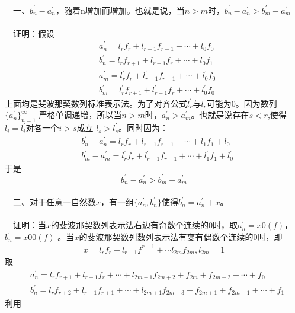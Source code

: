 \documentclass[UTF8,nofonts,cs4size]{ctexrep}
\begin{document}
\paragraph{}
\indent\ \
一、$b_{n}^{'}-a_{n}^{'}$，随着n增加而增加。也就是说，当$n>m$时，$b_{n}^{'}-a_{n}^{'}>b_{m}^{'}-a_{m}^{'}$
\paragraph{}
\indent\ \
证明：假设
\begin{eqnarray}
& a_{n}^{'} = l_r f_r+l_{r-1}f_{r-1}+\cdots +l_0f_0 \\
& b_{n}^{'} = l_r f_{r+1}+l_{r-1}f_{r}+\cdots +l_0f_1 \\
& a_{m}^{'} = l_{r}^{'}f_r+l_{r-1}^{'}f_{r-1}+\cdots +l_{0}^{'}f_0 \\
& b_{m}^{'} = l_{r}^{'}f_{r+1}+l_{r-1}^{'}f_{r}+\cdots +l_{0}^{'}f_0
\end{eqnarray}
上面均是斐波那契数列标准表示法。为了对齐公式$l_{r}^{'}$与$l_r$可能为0。因为数列$\{a_{n}^{'}\}_{n=1}^{\infty}$
严格单调递增，所以当$n>m$时，$a_{n}^{'}>a_{m}^{'}$。也就是说存在$s<r$,使得$l_i=l_{i}^{'}$对各一个$i>s$成立
$l_s>l_{s}^{'}$。同时因为：
\begin{eqnarray}
& b_{n}^{'} - a_{n}^{'} = l_r f_r+l_{r-1}f_{r-1}+\cdots +l_1f_1 + l_0 \\
& b_{m}^{'} - a_{m}^{'} = l_{r}^{'}f_{r}+l_{r-1}^{'}f_{r-1}+\cdots +l_{1}^{'}f_1+l_{0}^{'}
\end{eqnarray}
于是
\[
b_{n}^{'} - a_{n}^{'} > b_{m}^{'} - a_{m}^{'}
\]
\paragraph{}
\indent\ \
二、对于任意一自然数$x$，有一组$\{a_{n}^{'},b_{n}^{'} \}$使得$b_{n}^{'} =a_{n}^{'} + x$。
\paragraph{}
\indent\ \
证明：当$x$的斐波那契数列表示法右边有奇数个连续的0时，取$a_{n}^{'}=x0(f)$，$b_{n}^{'}=x00(f)$
。当$x$的斐波那契数列数列表示法有变有偶数个连续的0时，即
\begin{eqnarray}
x=l_{r}f_r+l_{r-1}f^{r-1}+\cdots  l_{2m}f_{2m},l_{2m}=1
\end{eqnarray}取
\begin{eqnarray}
& a_{n}^{'} = l_r f_{r+1}+l_{r-1}f_{r}+\cdots +l_{2m+1}f_{2m+2}+f_{2m}+f_{2m-2}+\cdots + f_0 \\
& b_{n}^{'} = l_r f_{r+2}+l_{r-1}f_{r+1}+\cdots +l_{2m+1}f_{2m+3}+f_{2m+1}+f_{2m-1}+\cdots + f_1
\end{eqnarray}
利用
\end{document}
